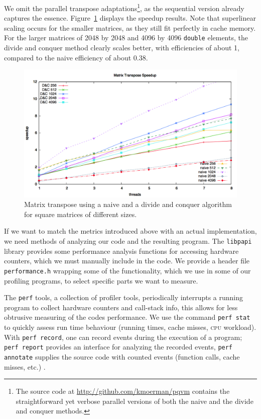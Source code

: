 \documentclass[a4paper,11pt, oneside]{report}
\newcommand{\code}[1]{\texttt{#1}}
\newcommand{\acro}[1]{\textsc{#1}}
\newcommand{\strongpar}{\medskip\par}
\begin{document}
We omit the parallel transpose adaptations\footnote{The source code at \url{http://github.com/kmoerman/pqvm} contains the straightforward yet verbose parallel versions of both the naive and the divide and conquer methods.}, as the sequential version already captures the essence. Figure~\ref{fig:transpose-speedup} displays the speedup results. Note that superlinear scaling occurs for the smaller matrices, as they still fit perfectly in cache memory. For the larger matrices of 2048 by 2048 and 4096 by 4096 \code{double} elements, the divide and conquer method clearly scales better, with efficiencies of about 1, compared to the naive efficiency of about 0.38.
\begin{figure}[hb]
	\centering
	\hspace*{-0.07\columnwidth}
	\includegraphics[width=1.09\columnwidth]{transpose.png}
	\caption{Matrix transpose using a naive and a divide and conquer algorithm for square matrices of different sizes.} \label{fig:transpose-speedup}
\end{figure}


\strongpar
If we want to match the metrics introduced above with an actual implementation, we need methods of analyzing our code and the resulting program. The \code{libpapi} library \cite{libpapi} provides some performance analysis functions for accessing hardware counters, which we must manually include in the code. We provide a header file \code{performance.h} wrapping some of the functionality, which we use in some of our profiling programs, to select specific parts we want to measure.

The \code{perf} tools, a collection of profiler tools, periodically interrupts a running program to collect hardware counters and call-stack info, this allows for less obtrusive measuring of the codes performance. We use the command \code{perf stat} to quickly assess run time behaviour (running times, cache misses, \acro{cpu} workload). With \code{perf record}, one can record events during the execution of a program; \code{perf report} provides an interface for analyzing the recorded events, \code{perf annotate} supplies the source code with counted events (function calls, cache misses, etc.) \cite{perf}.
\end{document}
